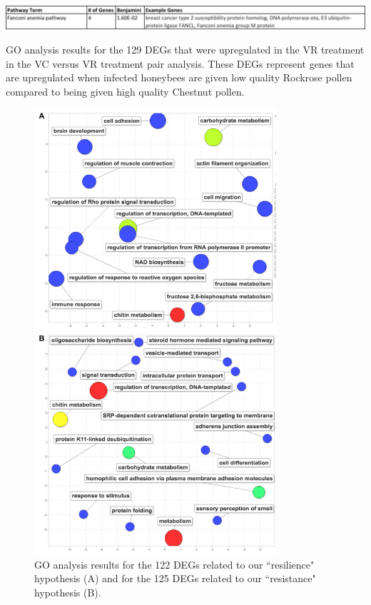 \documentclass[11pt,a4paper,oldfontcommands,openany]{memoir}
\numberwithin{equation}{section} %
\begin{document}
\begin{table}[H]
  \includegraphics[width=\textwidth]{Images/VCVRVRPathways}
  \caption{GO analysis results for the 129 DEGs that were upregulated in the VR treatment in the VC versus VR treatment pair analysis. These DEGs represent genes that are upregulated when infected honeybees are given low quality Rockrose pollen compared to being given high quality Chestnut pollen.}
  \label{tbl:VCVRVRPathways}
\end{table}

\begin{figure}[H]
  \includegraphics[width=0.8\textwidth]{Images/revigo}
  \caption{GO analysis results for the 122 DEGs related to our ``resilience" hypothesis (A) and for the 125 DEGs related to our ``resistance" hypothesis (B).}
  \label{fig:revigo}
\end{figure}
\end{document}
